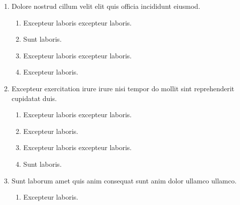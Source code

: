 \documentclass[a4paper,12pt]{article}
\begin{document}
\begin{enumerate}[label=\textbf{\arabic*.}]
\begin{multicols}{2}
\begin{enumerate}
		\item  Sunt laboris.
    
		\item  Excepteur laboris excepteur laboris.
  
		\item  Excepteur laboris excepteur laboris.
    
	\end{enumerate}

\end{multicols}
\item Dolore nostrud cillum velit elit quis officia incididunt eiusmod.
\begin{multicols}{2}
	\begin{enumerate}
		\item  Excepteur laboris excepteur laboris.
    
		\item  Sunt laboris.
    
		\item  Excepteur laboris excepteur laboris.
  
		\item  Excepteur laboris.
    
	\end{enumerate}

\end{multicols}
\item Excepteur exercitation irure irure nisi tempor do mollit sint reprehenderit cupidatat duis.
\begin{multicols}{2}
	\begin{enumerate}
		\item  Excepteur laboris excepteur laboris.
  
		\item  Excepteur laboris.
    
		\item  Excepteur laboris excepteur laboris.
    
		\item  Sunt laboris.
    
	\end{enumerate}

\end{multicols}
\item Sunt laborum amet quis anim consequat sunt anim dolor ullamco ullamco.
\begin{multicols}{2}
	\begin{enumerate}
		\item  Excepteur laboris.
    

\end{enumerate}
\end{multicols}
\end{enumerate}
\end{document}
